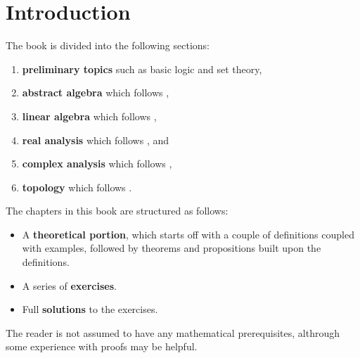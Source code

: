 \chapter*{Introduction}
The book is divided into the following sections:
\begin{enumerate}
\item \textbf{preliminary topics} such as basic logic and set theory, 
\item \textbf{abstract algebra} which follows \cite{dummit-foote}, 
\item \textbf{linear algebra} which follows \cite{hoffman-kunze}, 
\item \textbf{real analysis} which follows \cite{rudin,apostol}, and
\item \textbf{complex analysis} which follows \cite{ahlfors},
\item \textbf{topology} which follows \cite{munkres}.
\end{enumerate}

The chapters in this book are structured as follows:
\begin{itemize}
\item A \textbf{theoretical portion}, which starts off with a couple of definitions coupled with examples, followed by theorems and propositions built upon the definitions.
\item A series of \textbf{exercises}.
\item Full \textbf{solutions} to the exercises.
\end{itemize}

The reader is not assumed to have any mathematical prerequisites, althrough some experience with proofs may be helpful.

